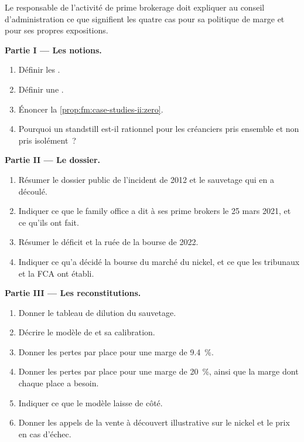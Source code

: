 \begin{problem}\label{pb:fm:case-studies-ii:1}
Le responsable de l'activité de prime brokerage doit expliquer au conseil d'administration ce que signifient les quatre cas pour sa politique de marge et pour ses propres expositions.

\medskip\noindent\textbf{Partie I --- Les notions.}
\begin{enumerate}
\item Définir les .
\item Définir une .
\item Énoncer la \cref{prop:fm:case-studies-ii:zero}.
\item Pourquoi un standstill est-il rationnel pour les créanciers pris ensemble et non pris isolément~?
\end{enumerate}

\medskip\noindent\textbf{Partie II --- Le dossier.}
\begin{enumerate}[resume]
\item Résumer le dossier public de l'incident de 2012 et le sauvetage qui en a découlé.
\item Indiquer ce que le family office a dit à ses prime brokers le 25 mars 2021, et ce qu'ils ont fait.
\item Résumer le déficit et la ruée de la bourse de 2022.
\item Indiquer ce qu'a décidé la bourse du marché du nickel, et ce que les tribunaux et la FCA ont établi.
\end{enumerate}

\medskip\noindent\textbf{Partie III --- Les reconstitutions.}
\begin{enumerate}[resume]
\item Donner le tableau de dilution du sauvetage.
\item Décrire le modèle de  et sa calibration.
\item Donner les pertes par place pour une marge de 9.4~\%.
\item Donner les pertes par place pour une marge de 20~\%, ainsi que la marge dont chaque place a besoin.
\item Indiquer ce que le modèle laisse de côté.
\item Donner les appels de la vente à découvert illustrative sur le nickel et le prix en cas d'échec.
\end{enumerate}


\end{problem}
